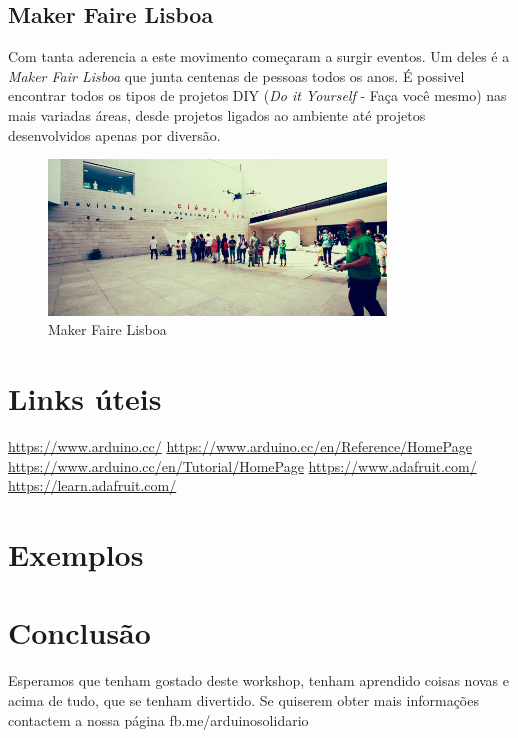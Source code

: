 \documentclass{article}
\begin{document}
\subsection{Maker Faire Lisboa}
Com tanta aderencia a este movimento começaram a surgir eventos. Um deles é a \textit{Maker Fair Lisboa} que junta centenas de pessoas todos os anos. É possivel encontrar todos os tipos de projetos DIY (\textit{Do it Yourself} - Faça você mesmo) nas mais variadas áreas, desde projetos ligados ao ambiente até projetos desenvolvidos apenas por diversão.

\begin{figure}[h]
\centering
\includegraphics[width=0.8\textwidth]{img/mflisboa}
\caption{Maker Faire Lisboa}
\end{figure}

\section{Links úteis}
\url{https://www.arduino.cc/}\newline
\url{https://www.arduino.cc/en/Reference/HomePage}\newline
\url{https://www.arduino.cc/en/Tutorial/HomePage}\newline\newline
\url{https://www.adafruit.com/}\newline
\url{https://learn.adafruit.com/}\newline


\section{Exemplos}

\section{Conclusão}
Esperamos que tenham gostado deste workshop, tenham aprendido coisas novas e acima de tudo, que se tenham divertido.
Se quiserem obter mais informações contactem a nossa página fb.me/arduinosolidario
\end{document}
